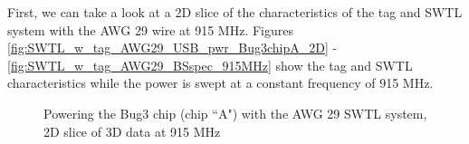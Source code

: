 \documentclass[12pt,onecolumn,titlepage]{article}
\begin{document}
First, we can take a look at a 2D slice of the characteristics of the tag and SWTL system with the AWG 29 wire at 915 MHz. Figures \ref{fig:SWTL_w_tag_AWG29_USB_pwr_Bug3chipA_2D} - \ref{fig:SWTL_w_tag_AWG29_BSspec_915MHz} show the tag and SWTL characteristics while the power is swept at a constant frequency of 915 MHz.



\begin{figure}[htbp]
	\centering
		\quad
		
	\label{fig:SWTL_w_tag_AWG29_2D}
	\caption{Powering the Bug3 chip (chip ``A") with the AWG 29 SWTL system, 2D slice of 3D data at 915 MHz }
\end{figure}
\end{document}
